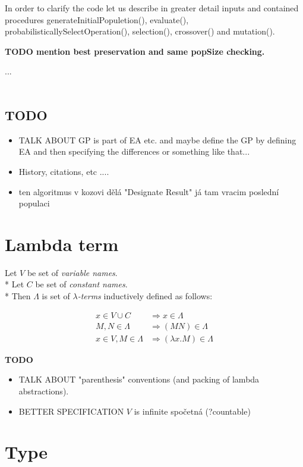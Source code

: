 \documentclass[12pt,a4paper]{report}
\newcommand{\lterms}{$\lambda$-terms\xspace}
\begin{document}
In order to clarify the code let us describe in greater detail inputs and
contained procedures
generateInitialPopuletion(),
evaluate(),
probabilisticallySelectOperation(),
selection(),
crossover() 
and mutation().

\textbf{TODO mention best preservation and same popSize checking. }




...\\\
\subsection{TODO}
	\begin{itemize} 
		\item TALK ABOUT GP is part of EA etc. and maybe define the GP by defining EA and then
		      specifying the differences or something like that...    
		\item History, citations, etc ....
		\item ten algoritmus v kozovi dělá "Designate Result" já tam vracim poslední populaci
	\end{itemize}	  


\newpage		
\section{Lambda term}
\label{deflam}
	
	Let $V$ be set of {\it variable names}.  \\* 
	Let $C$ be set of {\it constant names}.	 \\*		
	Then $\Lambda$ is set of {\it \lterms} inductively defined as follows:
	
	\begin{align*}
		 x   \in V \cup C          &\Rightarrow     x   \in \Lambda \\
		 M,N \in \Lambda           &\Rightarrow ( M N ) \in \Lambda \\
		 x   \in V , M \in \Lambda &\Rightarrow ( \lambda x . M ) \in \Lambda 
	\end{align*} 

	\textbf{TODO} 
	\begin{itemize} 
		\item TALK ABOUT "parenthesis" conventions (and packing of lambda abstractions).
		\item BETTER SPECIFICATION $V$ is infinite spočetná (?countable)
	\end{itemize}
	
\section{Type}
\label{deftype}
\end{document}
